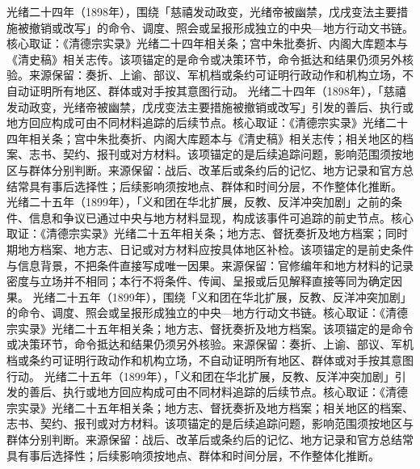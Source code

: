 光绪二十四年（1898年），围绕「慈禧发动政变，光绪帝被幽禁，戊戌变法主要措施被撤销或改写」的命令、调度、照会或呈报形成独立的中央—地方行动文书链。核心取证：《清德宗实录》光绪二十四年相关条；宫中朱批奏折、内阁大库题本与《清史稿》相关志传。该项锚定的是命令或决策环节，命令抵达和结果仍须另外核验。来源保留：奏折、上谕、部议、军机档或条约可证明行政动作和机构立场，不自动证明所有地区、群体或对手按其意图行动。
光绪二十四年（1898年），「慈禧发动政变，光绪帝被幽禁，戊戌变法主要措施被撤销或改写」引发的善后、执行或地方回应构成可由不同材料追踪的后续节点。核心取证：《清德宗实录》光绪二十四年相关条；宫中朱批奏折、内阁大库题本与《清史稿》相关志传；相关地区的档案、志书、契约、报刊或对方材料。该项锚定的是后续追踪问题，影响范围须按地区与群体分别判断。来源保留：战后、改革后或条约后的记忆、地方记录和官方总结常具有事后选择性；后续影响须按地点、群体和时间分层，不作整体化推断。
光绪二十五年（1899年），「义和团在华北扩展，反教、反洋冲突加剧」之前的条件、信息和争议已通过中央与地方材料显现，构成该事件可追踪的前史节点。核心取证：《清德宗实录》光绪二十五年相关条；地方志、督抚奏折及地方档案；同时期地方档案、地方志、日记或对方材料应按具体地区补检。该项锚定的是前史条件与信息背景，不把条件直接写成唯一因果。来源保留：官修编年和地方材料的记录密度与立场并不相同；本行不将条件、传闻、呈报或后见解释直接等同为确定因果。
光绪二十五年（1899年），围绕「义和团在华北扩展，反教、反洋冲突加剧」的命令、调度、照会或呈报形成独立的中央—地方行动文书链。核心取证：《清德宗实录》光绪二十五年相关条；地方志、督抚奏折及地方档案。该项锚定的是命令或决策环节，命令抵达和结果仍须另外核验。来源保留：奏折、上谕、部议、军机档或条约可证明行政动作和机构立场，不自动证明所有地区、群体或对手按其意图行动。
光绪二十五年（1899年），「义和团在华北扩展，反教、反洋冲突加剧」引发的善后、执行或地方回应构成可由不同材料追踪的后续节点。核心取证：《清德宗实录》光绪二十五年相关条；地方志、督抚奏折及地方档案；相关地区的档案、志书、契约、报刊或对方材料。该项锚定的是后续追踪问题，影响范围须按地区与群体分别判断。来源保留：战后、改革后或条约后的记忆、地方记录和官方总结常具有事后选择性；后续影响须按地点、群体和时间分层，不作整体化推断。
